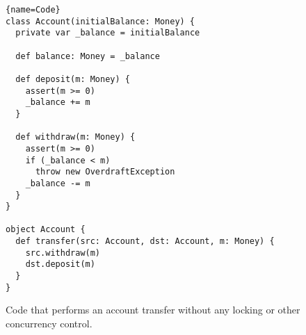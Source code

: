 \begin{figure}
\begin{lstlisting}{name=Code}
class Account(initialBalance: Money) {
  private var _balance = initialBalance

  def balance: Money = _balance

  def deposit(m: Money) {
    assert(m >= 0)
    _balance += m
  }

  def withdraw(m: Money) {
    assert(m >= 0)
    if (_balance < m)
      throw new OverdraftException
    _balance -= m
  }
}

object Account {
  def transfer(src: Account, dst: Account, m: Money) {
    src.withdraw(m)
    dst.deposit(m)
  }
}
\end{lstlisting}

\caption{Code that performs an account transfer without
any locking or other concurrency control.}

\label{fig:example:nosync}
\end{figure}
